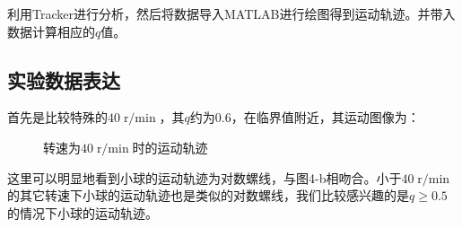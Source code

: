\documentclass{WHUReport}
\begin{document}
\begin{multicols}{2}
	利用Tracker进行分析，然后将数据导入MATLAB进行绘图得到运动轨迹。并带入数据计算相应的$q$值。
	\subsection{实验数据表达}
	首先是比较特殊的$40\operatorname{r/min}$，其$q$约为$0.6$，在临界值附近，其运动图像为：
	\begin{figure}[H]
		\centering  %
		\subfigbottomskip=2pt %
		\subfigcapskip=-5pt %
		\caption{转速为$40\operatorname{r/min}$时的运动轨迹}
	\end{figure}
	
	这里可以明显地看到小球的运动轨迹为对数螺线，与图4-b相吻合。小于$40\operatorname{r/min}$的其它转速下小球的运动轨迹也是类似的对数螺线，我们比较感兴趣的是$q\geq0.5$的情况下小球的运动轨迹。

\end{multicols}
\end{document}
